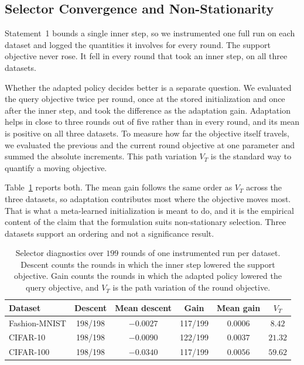 \documentclass[journal]{IEEEtran}
\newcommand{\revision}[1]{#1}
\begin{document}
\subsection{\revision{Selector Convergence and Non-Stationarity}}
\revision{Statement~1 bounds a single inner step, so we instrumented one full run on each dataset and logged the quantities it involves for every round. The support objective never rose. It fell in every round that took an inner step, on all three datasets.}

\revision{Whether the adapted policy decides better is a separate question. We evaluated the query objective twice per round, once at the stored initialization and once after the inner step, and took the difference as the adaptation gain. Adaptation helps in close to three rounds out of five rather than in every round, and its mean is positive on all three datasets. To measure how far the objective itself travels, we evaluated the previous and the current round objective at one parameter and summed the absolute increments. This path variation $V_T$ is the standard way to quantify a moving objective.}

\revision{Table~\ref{tab:drift} reports both. The mean gain follows the same order as $V_T$ across the three datasets, so adaptation contributes most where the objective moves most. That is what a meta-learned initialization is meant to do, and it is the empirical content of the claim that the formulation suits non-stationary selection. Three datasets support an ordering and not a significance result.}

\begin{table}[!t]
\centering
\caption{\revision{Selector diagnostics over $199$ rounds of one instrumented run per dataset. Descent counts the rounds in which the inner step lowered the support objective. Gain counts the rounds in which the adapted policy lowered the query objective, and $V_T$ is the path variation of the round objective.}}
\label{tab:drift}
\scriptsize
\setlength{\tabcolsep}{3pt}
\renewcommand{\arraystretch}{0.92}
\begin{tabular*}{\columnwidth}{@{\extracolsep{\fill}}lccccc@{}}
\toprule
Dataset & Descent & Mean descent & Gain & Mean gain & $V_T$ \\
\midrule
Fashion-MNIST & 198/198 & $-0.0027$ & 117/199 & $0.0006$ & $8.42$ \\
CIFAR-10      & 198/198 & $-0.0090$ & 122/199 & $0.0037$ & $21.32$ \\
CIFAR-100     & 198/198 & $-0.0340$ & 117/199 & $0.0056$ & $59.62$ \\
\bottomrule
\end{tabular*}
\end{table}
\end{document}
